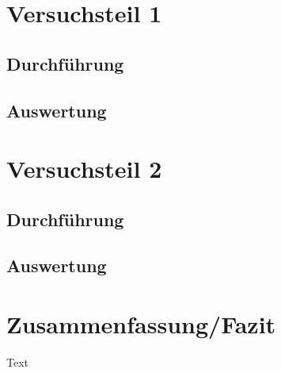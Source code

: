 \documentclass[11pt]{scrartcl}
\begin{document}
\section{Versuchsteil 1}


\subsection{Durchführung}


\subsection{Auswertung}


\section{Versuchsteil 2}



\subsection{Durchführung}



\subsection{Auswertung}




\section{Zusammenfassung/Fazit}

Text
\end{document}
